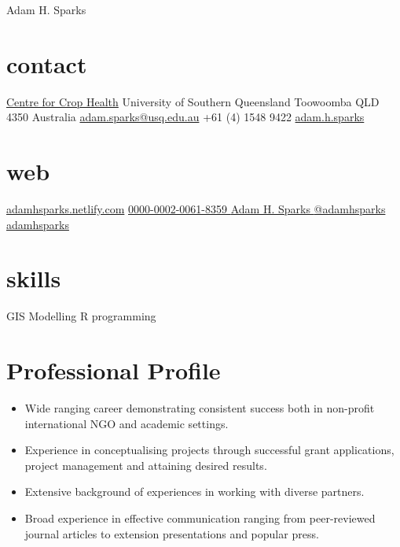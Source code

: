 
\hfill {\Huge Adam H. Sparks}
\begin{aside}
\small{\section{contact}}
\small{\href{http://www.usq.edu.au/research/research-at-usq/institutes-centres/cch}{Centre for Crop Health}}
\small{University of Southern Queensland}
\small{Toowoomba QLD 4350}
\small{Australia}
\small{\href{mailto:adam.sparks@usq.edu.au}{adam.sparks@usq.edu.au}}
\small{+61 (4) 1548 9422 \faMobilePhone{}}
\small{\href{skype:adam.h.sparks?call}{adam.h.sparks }}
\section{web}
	\footnotesize{\href{https://adamhsparks.netlify.com}{adamhsparks.netlify.com}\FA {}}
	\footnotesize{\href{http://orcid.org/0000-0002-0061-8359}{0000-0002-0061-8359 {\color{orcid.green}}}}
	\footnotesize{\href{https://www.linkedin.com/in/adam-h-sparks-507b968}{Adam H. Sparks {\color{linkedin}\FA {}}}}
	\footnotesize{\href{https://www.twitter.com/adamhsparks/}{@adamhsparks {\color{twitter.blue}\FA {}}}}
	\footnotesize{\href{https://github.com/adamhsparks/}{adamhsparks \FA {}}}
\footnotesize{\section{skills}}
\small{GIS}
\small{Modelling}
\small{R programming}
\end{aside}

\section*{Professional Profile}

\begin{itemize}
\setlength{\leftmargin}{0pt}
\item Wide ranging career demonstrating consistent success both in non-profit international NGO and academic settings.
\item Experience in conceptualising projects through successful grant applications, project management and attaining desired results.
\item Extensive background of experiences in working with diverse partners.
\item Broad experience in effective communication ranging from peer-reviewed journal articles to extension presentations and popular press.
\end{itemize}


